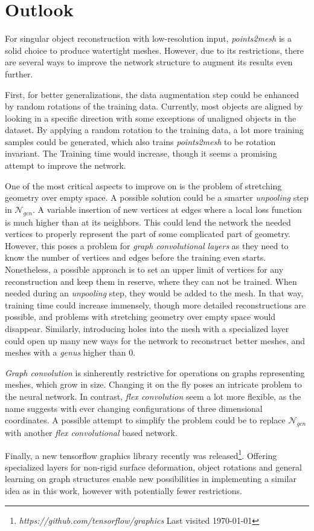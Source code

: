 \section{Outlook}
\label{outlook}
  For singular object reconstruction with low-resolution input, \emph{points2mesh} is a solid choice to produce watertight meshes. However, 
  due to its restrictions, there are several ways to improve the network structure to augment its results even further.

  First, for better generalizations, the data augmentation step could be enhanced by random rotations of the training data. Currently, 
  most objects are aligned by looking in a specific direction with some exceptions of unaligned objects in the dataset. By applying a
  random rotation to the training data, a lot more training samples could be generated, which also trains \emph{points2mesh} to be rotation
  invariant. The Training time would increase, though it seems a promising attempt to improve the network.

  One of the most critical aspects to improve on is the problem of stretching geometry over empty space. A possible solution could be a smarter
  \emph{unpooling} step in $\mathcal{N}_{gcn}$. A variable insertion of new vertices at edges where a local loss function is much higher than 
  at its neighbors. This could lend the network the needed vertices to properly represent the part of some complicated part of geometry. However,
  this poses a problem for \emph{graph convolutional layers} as they need to know the number of vertices and edges before the training even starts.
  Nonetheless, a possible approach is to set an upper limit of vertices for any reconstruction and keep them in reserve, where they can not be trained.
  When needed during an \emph{unpooling} step, they would be added to the mesh. In that way, training time could increase immensely, though more detailed 
  reconstructions are possible, and problems with stretching geometry over empty space would disappear. Similarly, introducing holes into the mesh with a 
  specialized layer could open up many new ways for the network to reconstruct better meshes, and meshes with a \emph{genus} higher than 0. 

  \emph{Graph convolution} is sinherently restrictive for operations on graphs representing meshes, which grow in size. Changing it on the fly poses an
  intricate problem to the neural network. In contrast, \emph{flex convolution} seem a lot more flexible, as the name suggests with ever changing configurations 
  of three dimensional coordinates. A possible attempt to simplify the problem could be to replace $\mathcal{N}_{gcn}$ with another \emph{flex convolutional} 
  based network. 

  Finally, a new tensorflow graphics library recently was released\footnote{\emph{https://github.com/tensorflow/graphics} Last visited \today}. Offering specialized layers for non-rigid surface deformation,
   object rotations and general learning on graph structures enable new possibilities in implementing a similar idea as in this work,
    however with potentially fewer restrictions.
